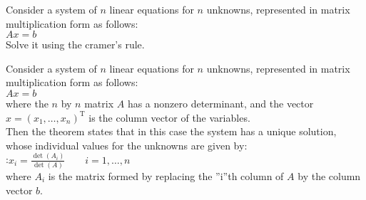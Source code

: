 \documentclass[12pt]{article}
\newcommand*{\xfield}[1]{\begin{mdframed}\centering #1\end{mdframed}\bigskip}
\newenvironment{note}{}{}
\begin{document}
\begin{note}
	\xfield{Consider a system of $n$ linear equations for $n$ unknowns, represented in matrix multiplication form as follows:\\
	$Ax = b$\\
	Solve it using the cramer's rule.}
	\xfield{Consider a system of $n$ linear equations for $n$ unknowns, represented in matrix multiplication form as follows:\\
	$Ax = b$\\
where the $n$ by $n$ matrix $ A $ has a nonzero determinant, and the vector $ x = (x_1, \ldots, x_n)^\mathrm{T} $ is the column vector of the variables.\\
Then the theorem states that in this case the system has a unique solution, whose individual values for the unknowns are given by:\\
:$ x_i = \frac{\det(A_i)}{\det(A)} \qquad i = 1, \ldots, n \, $\\
where $ A_i $ is the matrix formed by replacing the ''i''th column of $ A $ by the column vector $ b $.}
\end{note}
\end{document}

